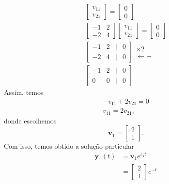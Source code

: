 \begin{ex}
\begin{gather}
\begin{bmatrix}
      v_{11} \\
      v_{21}
    \end{bmatrix} =
    \begin{bmatrix}
      0 \\
      0
    \end{bmatrix} \\
    \begin{bmatrix}
      -1 & 2 \\
      -2 & 4
    \end{bmatrix}
    \begin{bmatrix}
      v_{11} \\
      v_{21}
    \end{bmatrix} =
    \begin{bmatrix}
      0 \\
      0
    \end{bmatrix} \\
    \begin{bmatrix}
      -1 & 2 & | & 0 \\
      -2 & 4 & | & 0
    \end{bmatrix}
    \begin{matrix}
      \times 2 \\
      \leftarrow -
    \end{matrix} \\
    \begin{bmatrix}
      -1 & 2 & | & 0 \\
      0 & 0 & | & 0
    \end{bmatrix}    
  \end{gather}
  Assim, temos
  \begin{gather}
    -v_{11} + 2v_{21} = 0 \\
    v_{11} = 2v_{21},
  \end{gather}
  donde escolhemos
  \begin{equation}
    \pmb{v}_1 =
    \begin{bmatrix}
      2 \\
      1
    \end{bmatrix}.
  \end{equation}
  Com isso, temos obtido a solução particular
  \begin{align}
    \pmb{y}_1(t) &= \pmb{v}_1e^{r_1t} \\
    &=
    \begin{bmatrix}
      2\\
      1
    \end{bmatrix}e^{-t}
  \end{align}



\end{ex}
